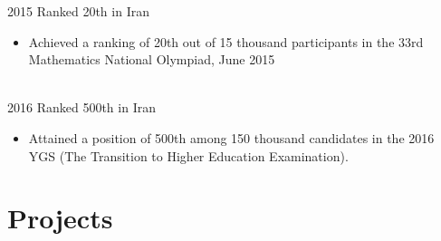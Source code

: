 \documentclass[letterpaper]{DS_class_file} %
\begin{document}
\begin{twenty} %
	\twentyitem
	{2015}
	{}
	{\hspace{0.3cm}Ranked 20th in Iran}
	{}
	{}
	{
		{\begin{itemize}
				\item Achieved a ranking of 20th out of 15 thousand participants in the 33rd Mathematics National Olympiad, June 2015
		\end{itemize}}
	}
	\\
	\twentyitem
	{2016}
	{}
	{\hspace{0.3cm}Ranked 500th in Iran}
	{}
	{}
	{\begin{itemize}
			\item Attained a position of 500th among 150 thousand candidates in the 2016 YGS (The Transition to Higher Education Examination).    
   
	\end{itemize}}

\end{twenty}


\makeseconda %

\section{Projects}
\end{document}
